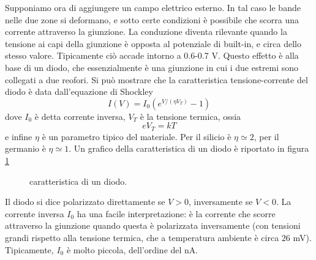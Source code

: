 \documentclass[a4paper, 11pt]{article}
\begin{document}
	Supponiamo ora di aggiungere un campo elettrico esterno. In tal caso le bande nelle due zone si deformano, e sotto certe condizioni è possibile che scorra una corrente attraverso la giunzione. La conduzione diventa rilevante quando la tensione ai capi della giunzione è opposta al potenziale di built-in, e circa dello stesso valore. Tipicamente ciò accade intorno a 0.6-0.7 V. Questo effetto è alla base di un diodo, che essenzialmente è una giunzione in cui i due estremi sono collegati a due reofori. Si può mostrare che la caratteristica tensione-corrente del diodo è data dall'equazione di Shockley
	\[I(V)=I_0\left(e^{V/(\eta V_T)}-1\right)\]
	dove $I_0$ è detta corrente inversa, $V_T$ è la tensione termica, ossia
	\[eV_T=kT\]
	e infine $\eta$ è un parametro tipico del materiale. Per il silicio è $\eta\simeq2$, per il germanio è $\eta\simeq 1$. Un grafico della caratteristica di un diodo è riportato in figura \ref{fig:shockley}
	\begin{figure}[h!]
		\centering
		\caption{caratteristica di un diodo.}
		\label{fig:shockley}
	\end{figure}
	Il diodo si dice polarizzato direttamente se $V>0$, inversamente se $V<0$. La corrente inversa $I_0$ ha una facile interpretazione: è la corrente che scorre attraverso la giunzione quando questa è polarizzata inversamente (con tensioni grandi rispetto alla tensione termica, che a temperatura ambiente è circa $26$ mV). Tipicamente, $I_0$ è molto piccola, dell'ordine del nA.
	
\end{document}
